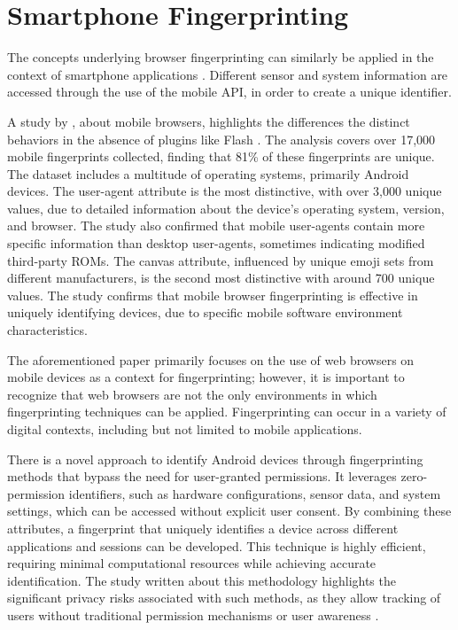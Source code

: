 \documentclass[11pt,
  oneside,openany,    %
]{scrreprt}
\begin{document}
\section{Smartphone Fingerprinting}
\label{sec:smartphone_fingerprint}
The concepts underlying browser fingerprinting can similarly be applied in the context of smartphone applications \cite{DBLP:conf/IEEEares/PalfingerP20}. 
Different sensor and system information are accessed through the use of the mobile API, in order to create a unique identifier.

A study by \citeauthor{DBLP:conf/www/Gomez-BoixLB18}, about mobile browsers, highlights the differences the distinct behaviors in the absence of plugins like Flash \cite{DBLP:conf/www/Gomez-BoixLB18}.
The analysis covers over 17,000 mobile fingerprints collected, finding that 81\% of these fingerprints are unique. 
The dataset includes a multitude of operating systems, primarily Android devices.
The user-agent attribute is the most distinctive, with over 3,000 unique values, due to detailed information about the device's operating system, version, and browser. 
The study also confirmed that mobile user-agents contain more specific information than desktop user-agents, sometimes indicating modified third-party ROMs.
The canvas attribute, influenced by unique emoji sets from different manufacturers, is the second most distinctive with around 700 unique values.
The study confirms that mobile browser fingerprinting is effective in uniquely identifying devices, due to specific mobile software environment characteristics.

The aforementioned paper primarily focuses on the use of web browsers on mobile devices as a context for fingerprinting; however, it is important to recognize that web browsers are not the only environments in which fingerprinting techniques can be applied.
Fingerprinting can occur in a variety of digital contexts, including but not limited to mobile applications.

There is a novel approach to identify Android devices through fingerprinting methods that bypass the need for user-granted permissions.
It leverages zero-permission identifiers, such as hardware configurations, sensor data, and system settings, which can be accessed without explicit user consent.
By combining these attributes, a fingerprint that uniquely identifies a device across different applications and sessions can be developed.
This technique is highly efficient, requiring minimal computational resources while achieving accurate identification.
The study written about this methodology highlights the significant privacy risks associated with such methods, as they allow tracking of users without traditional permission mechanisms or user awareness \cite{DBLP:journals/access/WuWWLY16}.
\end{document}
